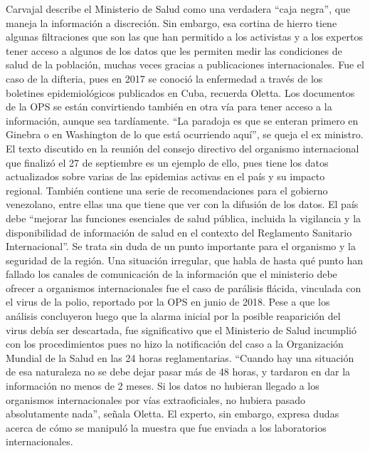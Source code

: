 \documentclass{article}%
\begin{document}
\newline%
%
Carvajal describe el Ministerio de Salud como una verdadera “caja negra”, que maneja la información a discreción. Sin embargo, esa cortina de hierro tiene algunas filtraciones que son las que han permitido a los activistas y a los expertos tener acceso a algunos de los datos que les permiten medir las condiciones de salud de la población, muchas veces gracias a publicaciones internacionales. Fue el caso de la difteria, pues en 2017 se conoció la enfermedad a través de los boletines epidemiológicos publicados en Cuba, recuerda Oletta.%
\newline%
%
Los documentos de la OPS se están convirtiendo también en otra vía para tener acceso a la información, aunque sea tardíamente. “La paradoja es que se enteran primero en Ginebra o en Washington de lo que está ocurriendo aquí”, se queja el ex ministro. El texto discutido en la reunión del consejo directivo del organismo internacional que finalizó el 27 de septiembre es un ejemplo de ello, pues tiene los datos actualizados sobre varias de las epidemias activas en el país y su impacto regional. También contiene una serie de recomendaciones para el gobierno venezolano, entre ellas una que tiene que ver con la difusión de los datos. El país debe “mejorar las funciones esenciales de salud pública, incluida la vigilancia y la disponibilidad de información de salud en el contexto del Reglamento Sanitario Internacional”.%
\newline%
%
Se trata sin duda de un punto importante para el organismo y la seguridad de la región. Una situación irregular, que habla de hasta qué punto han fallado los canales de comunicación de la información que el ministerio debe ofrecer a organismos internacionales fue el caso de parálisis flácida, vinculada con el virus de la polio, reportado por la OPS en junio de 2018. Pese a que los análisis concluyeron luego que la alarma inicial por la posible reaparición del virus debía ser descartada, fue significativo que el Ministerio de Salud incumplió con los procedimientos pues no hizo la notificación del caso a la Organización Mundial de la Salud en las 24 horas reglamentarias. “Cuando hay una situación de esa naturaleza no se debe dejar pasar más de 48 horas, y tardaron en dar la información no menos de 2 meses. Si los datos no hubieran llegado a los organismos internacionales por vías extraoficiales, no hubiera pasado absolutamente nada”, señala Oletta. El experto, sin embargo, expresa dudas acerca de cómo se manipuló la muestra que fue enviada a los laboratorios internacionales.%
\end{document}

